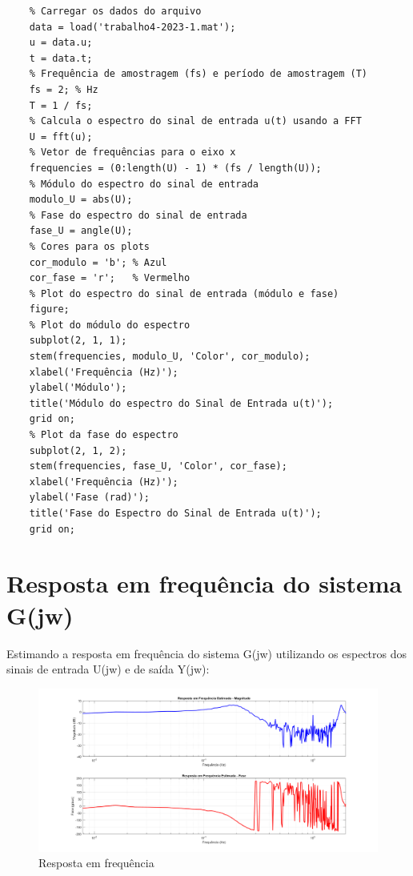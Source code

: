 \documentclass[10pt]{article}
\begin{document}
\small
\begin{verbatim}
    % Carregar os dados do arquivo
    data = load('trabalho4-2023-1.mat');
    u = data.u;
    t = data.t;
    % Frequência de amostragem (fs) e período de amostragem (T)
    fs = 2; % Hz
    T = 1 / fs;
    % Calcula o espectro do sinal de entrada u(t) usando a FFT
    U = fft(u);
    % Vetor de frequências para o eixo x
    frequencies = (0:length(U) - 1) * (fs / length(U));
    % Módulo do espectro do sinal de entrada
    modulo_U = abs(U);
    % Fase do espectro do sinal de entrada
    fase_U = angle(U);
    % Cores para os plots
    cor_modulo = 'b'; % Azul
    cor_fase = 'r';   % Vermelho
    % Plot do espectro do sinal de entrada (módulo e fase)
    figure;
    % Plot do módulo do espectro
    subplot(2, 1, 1);
    stem(frequencies, modulo_U, 'Color', cor_modulo);
    xlabel('Frequência (Hz)');
    ylabel('Módulo');
    title('Módulo do espectro do Sinal de Entrada u(t)');
    grid on;
    % Plot da fase do espectro
    subplot(2, 1, 2);
    stem(frequencies, fase_U, 'Color', cor_fase);
    xlabel('Frequência (Hz)');
    ylabel('Fase (rad)');
    title('Fase do Espectro do Sinal de Entrada u(t)');
    grid on;
\end{verbatim}

\section{Resposta em frequência do sistema G(jw)}

\quad Estimando a resposta em frequência do sistema G(jw) utilizando os espectros dos sinais
de entrada U(jw) e de saída Y(jw):

\begin{figure}[h]
    \centering
    \includegraphics[scale=0.26]{g.png}
    \caption{Resposta em frequência}
\end{figure}
\end{document}
